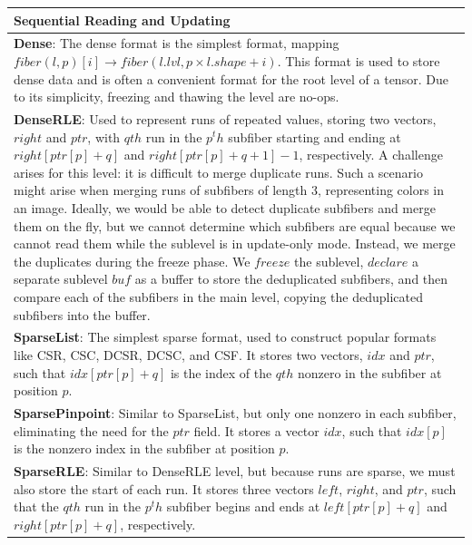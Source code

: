 \begin{table}[ht]
    \centering
    \footnotesize
    \begin{tabular}{p{14cm}}

    \hline
    \textbf{Sequential Reading and Updating} \\
    \hline
    \textbf{Dense}:
    The dense format is the simplest format, mapping $fiber(l, p)[i] \rightarrow fiber(l.lvl, p \times l.shape + i)$.
    This format is used to store dense data and is often a convenient format for the root level of a tensor.
    Due to its simplicity, freezing and thawing the level are no-ops. \\
    \textbf{DenseRLE}:
    Used to represent runs of repeated values, storing two vectors, $right$ and $ptr$, with $qth$ run in the $p^th$ subfiber starting and ending at $right[ptr[p] + q]$ and $right[ptr[p] + q + 1] - 1$, respectively.
    A challenge arises for this level: it is difficult to merge duplicate runs.
    Such a scenario might arise when merging runs of subfibers of length 3, representing colors in an image.
    Ideally, we would be able to detect duplicate subfibers and merge them on the fly, but we cannot determine which subfibers are equal because we cannot read them while the sublevel is in update-only mode.
    Instead, we merge the duplicates during the freeze phase.
    We $freeze$ the sublevel, $declare$ a separate sublevel $buf$ as a buffer to store the deduplicated subfibers, and then compare each of the subfibers in the main level, copying the deduplicated subfibers into the buffer. \\
    \textbf{SparseList}:
    The simplest sparse format, used to construct popular formats like CSR, CSC, DCSR, DCSC, and CSF.
    It stores two vectors, $idx$ and $ptr$, such that $idx[ptr[p] + q]$ is the index of the $qth$ nonzero in the subfiber at position $p$. \\
    \textbf{SparsePinpoint}:
    Similar to SparseList, but only one nonzero in each subfiber, eliminating the need for the $ptr$ field.
    It stores a vector $idx$, such that $idx[p]$ is the nonzero index in the subfiber at position $p$. \\
    \textbf{SparseRLE}:
    Similar to DenseRLE level, but because runs are sparse, we must also store the start of each run.
    It stores three vectors $left$, $right$, and $ptr$, such that the $qth$ run in the $p^th$ subfiber begins and ends at $left[ptr[p] + q]$ and $right[ptr[p] + q]$, respectively.

\end{tabular}
\end{table}
